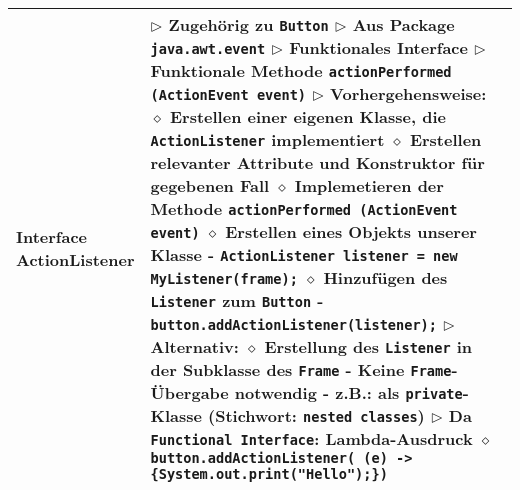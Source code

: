 \begin{longtable}{ | p{} p{} | }
	\makecell[l]{Interface \\ ActionListener} & \makecell[l]{
	$\triangleright$ Zugehörig zu \texttt{Button} \\
	$\triangleright$ Aus Package \texttt{java.awt.event} \\
	$\triangleright$ Funktionales Interface \\
	$\triangleright$ Funktionale Methode \texttt{actionPerformed (ActionEvent event)} \\
	$\triangleright$ Vorhergehensweise: \\
	\hspace{0.4cm} $\diamond$ Erstellen einer eigenen Klasse, die \texttt{ActionListener} implementiert \\
	\hspace{0.4cm} $\diamond$ Erstellen relevanter Attribute und Konstruktor für gegebenen Fall \\
	\hspace{0.4cm} $\diamond$ Implemetieren der Methode \texttt{actionPerformed (ActionEvent event)} \\
	\hspace{0.4cm} $\diamond$ Erstellen eines Objekts unserer Klasse \\ 
	\hspace{0.6cm} - \texttt{ActionListener listener = new MyListener(frame);} \\
	\hspace{0.4cm} $\diamond$ Hinzufügen des \texttt{Listener} zum \texttt{Button} \\
	\hspace{0.6cm} - \texttt{button.addActionListener(listener);} \\
	$\triangleright$ Alternativ: \\
	\hspace{0.4cm} $\diamond$ Erstellung des \texttt{Listener} in der Subklasse des \texttt{Frame} \\ 
	\hspace{0.6cm} - Keine \texttt{Frame}-Übergabe notwendig \\
    \hspace{0.6cm} - z.B.: als \texttt{private}-Klasse (Stichwort: \texttt{nested classes}) \\
    $\triangleright$ Da \texttt{Functional Interface}: Lambda-Ausdruck \\
    \hspace{0.4cm} $\diamond$ \texttt{button.addActionListener( (e) -> \{System.out.print("Hello");\})}
	 } \\ \hline


\end{longtable}
